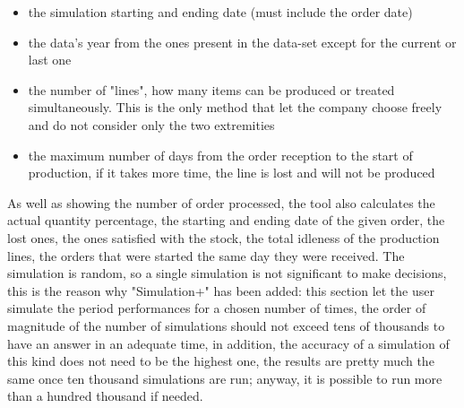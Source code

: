 \documentclass[a4paper,12pt]{article}
\begin{document}
\begin{itemize}
	\item the simulation starting and ending date (must include the order date)
	\item the data's year from the ones present in the data-set except for the current or last one
	\item the number of "lines", how many items can be produced or treated simultaneously. This is the only method that let the company choose freely and do not consider only the two extremities
	\item the maximum number of days from the order reception to the start of production, if it takes more time, the line is lost and will not be produced
\end{itemize}
As well as showing the number of order processed, the tool also calculates the actual quantity percentage, the starting and ending date of the given order, the lost ones, the ones satisfied with the stock, the total idleness of the production lines, the orders that were started the same day they were received. The simulation is random, so a single simulation is not significant to make decisions, this is the reason why "Simulation+" has been added: this section let the user simulate the period performances for a chosen number of times, the order of magnitude of the number of simulations should not exceed tens of thousands to have an answer in an adequate time, in addition, the accuracy of a simulation of this kind does not need to be the highest one, the results are pretty much the same once ten thousand simulations are run; anyway, it is possible to run more than a hundred thousand if needed.


\newpage
\end{document}
